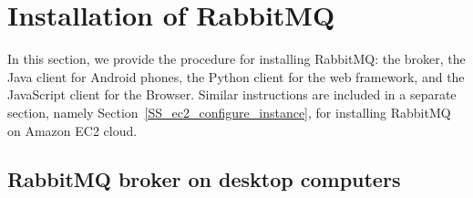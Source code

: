 
\section{Installation of RabbitMQ}
\label{S_installation_rabbitmq_local}

In this section, we provide the procedure for installing
\textsf{RabbitMQ}: the broker, the Java client for Android phones, the
Python client for the web framework, and the JavaScript client for the
Browser. Similar instructions are included in a separate section,
namely Section~\ref{SS_ec2_configure_instance}, for installing
\textsf{RabbitMQ} on Amazon EC2 cloud.

\subsection{RabbitMQ broker on desktop computers}

